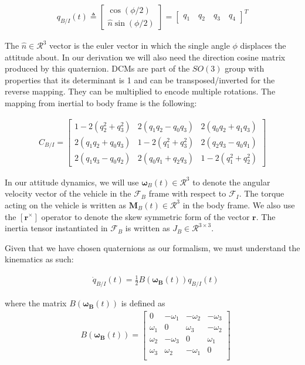 \begin{align}
q_{B/I}(t) \triangleq 
	\begin{bmatrix}
	\cos(\phi/2) \\ \hat{n}\sin(\phi/2)
	\end{bmatrix}
	= 
	\begin{bmatrix}
	q_1 \quad q_2 \quad q_3 \quad q_4
	\end{bmatrix}^T
\end{align}

The $\hat{n} \in \mathcal{R}^3$ vector is the euler vector in which the single angle $\phi$ displaces the attitude about. In our derivation we will also need the direction cosine matrix produced by this quaternion. DCMs are part of the $SO(3)$ group with properties that its determinant is 1 and can be transposed/inverted for the reverse mapping. They can be multiplied to encode multiple rotations. The mapping from inertial to body frame is the following:

\begin{align}
C_{B/I}={\begin{bmatrix}1-2(q_{2}^{2}+q_{3}^{2})&2(q_{1}q_{2}-q_{0}q_{3})&2(q_{0}q_{2}+q_{1}q_{3})\\2(q_{1}q_{2}+q_{0}q_{3})&1-2(q_{1}^{2}+q_{3}^{2})&2(q_{2}q_{3}-q_{0}q_{1})\\2(q_{1}q_{3}-q_{0}q_{2})&2(q_{0}q_{1}+q_{2}q_{3})&1-2(q_{1}^{2}+q_{2}^{2})\end{bmatrix}}
\end{align}

In our attitude dynamics, we will use $\bm{\omega}_B(t) \in \mathcal{R}^3$ to denote the angular velocity vector of the vehicle in the $\mathcal{F}_B$ frame with respect to $\mathcal{F}_I$. The torque acting on the vehicle is written as $\mathbf{M}_B(t) \in \mathcal{R}^3$ in the body frame. We also use the $\left[\mathbf{r}^\times \right]$ operator to denote the skew symmetric form of the vector $\mathbf{r}$. The inertia tensor instantiated in $\mathcal{F}_B$ is written as $J_B \in \mathcal{R}^{3\times 3}$.

Given that we have chosen quaternions as our formalism, we must understand the kinematics as such:

\begin{align}
 & \dot{q}_{B/I}(t) = \frac{1}{2} B(\bm{\omega_B}(t)) q_{B/I}(t)
\end{align}

where the matrix $B(\bm{\omega_B}(t))$ is defined as 
\begin{align}
& B(\bm{\omega_B}(t)) = 
	\begin{bmatrix}
	0 & -\omega_1 & -\omega_2 & -\omega_3\\ 
	\omega_1 & 0 & \omega_3 & -\omega_2 \\
	\omega_2 & -\omega_3 & 0 & \omega_1 \\
	\omega_3 & \omega_2 & -\omega_1  & 0  \\
	\end{bmatrix}
\end{align}

